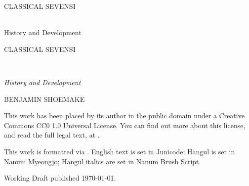\pagestyle{empty}


\begin{vplace}[0.25]\begin{center}
\begin{large}CLASSICAL SEVENSI\end{large}\\
History and Development
\end{center}\end{vplace}


\cleardoublepage

\noindent\begin{huge}CLASSICAL SEVENSI\end{huge}\\
\begin{large}\emph{History and Development}\end{large}

\medskip

\noindent BENJAMIN SHOEMAKE

\newpage

\begin{small}

\noindent This work has been placed by its author in the public domain under a Creative Commons CC0 1.0 Universal License.
You can find out more about this license, and read the full legal text, at \linebreak[0]\linebreak[0]\linebreak[0]\linebreak[0].

\medskip

\noindent This work is formatted via \XeLaTeX.
English text is set in Junicode; Hangul is set in Nanum Myeongjo; Hangul italics are set in Nanum Brush Script.

\medskip

\noindent Working Draft published \today.

\end{small}

